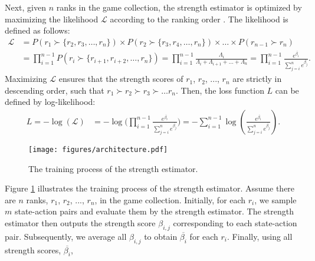 Next, given $n$ ranks in the game collection, the strength estimator is optimized by maximizing the likelihood $\mathcal{L}$ according to the ranking order \citep{xia_listwise_2008,chen_ranking_2009}.
The likelihood is defined as follows:
\begin{align}
\label{equ:likelihood}
    \mathcal{L} &= P(r_1\succ\{r_2, r_3, \ldots, r_n\}) \times P(r_2\succ\{r_3, r_4, \ldots, r_n\}) \times \ldots \times P(r_{n-1}\succ r_n)\nonumber\\
                &= \prod_{i=1}^{n-1} P(r_i \succ \{r_{i+1}, r_{i+2}, \ldots, r_{n}\})
                = \prod_{i=1}^{n-1} \frac{\Lambda_{i}}{\Lambda_{i} + \Lambda_{i+1} + \ldots + \Lambda_{n}}
                = \prod_{i=1}^{n-1}\frac{e^{\overline{\beta_i}}}{\sum_{j=i}^{n}e^{\overline{\beta_j}}}.
\end{align}
Maximizing $\mathcal{L}$ ensures that the strength scores of $r_1$, $r_2$, ..., $r_n$ are strictly in descending order, such that $r_1 \succ r_2 \succ r_3 \succ \ldots r_n$.
Then, the loss function $L$ can be defined by log-likelihood:
\begin{align}
\label{equ:loss_function}
    L = -\log(\mathcal{L}) &= -\log\biggl(\prod_{i=1}^{n-1}\frac{e^{\overline{\beta_i}}}{\sum_{j=i}^{n}e^{\overline{\beta_j}}}\bigg)
    = -\sum_{i=1}^{n-1}\log(\frac{e^{\overline{\beta_i}}}{\sum_{j=i}^{n}e^{\overline{\beta_j}}}).
\end{align}

\begin{figure}[t]
\centering
\texttt{[image: figures/architecture.pdf]}
\caption{The training process of the strength estimator.}
\label{fig:architecture}
\end{figure}

Figure \ref{fig:architecture} illustrates the training process of the strength estimator.
Assume there are $n$ ranks, $r_1$, $r_2$, ..., $r_n$, in the game collection.
Initially, for each $r_i$, we sample $m$ state-action pairs and evaluate them by the strength estimator.
The strength estimator then outputs the strength score $\beta_{i,j}$ corresponding to each state-action pair.
Subsequently, we average all $\beta_{i,j}$ to obtain $\overline{\beta_i}$ for each $r_i$.
Finally, using all strength scores, $\overline{\beta_i}$, 

